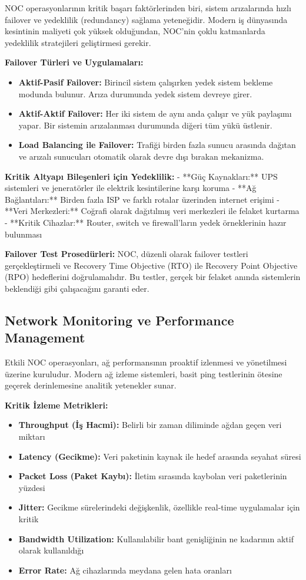 NOC operasyonlarının kritik başarı faktörlerinden biri, sistem arızalarında hızlı failover ve yedeklilik (redundancy) sağlama yeteneğidir. Modern iş dünyasında kesintinin maliyeti çok yüksek olduğundan, NOC'nin çoklu katmanlarda yedeklilik stratejileri geliştirmesi gerekir.

\textbf{Failover Türleri ve Uygulamaları:}
\begin{itemize}
    \item \textbf{Aktif-Pasif Failover:} Birincil sistem çalışırken yedek sistem bekleme modunda bulunur. Arıza durumunda yedek sistem devreye girer.
    \item \textbf{Aktif-Aktif Failover:} Her iki sistem de aynı anda çalışır ve yük paylaşımı yapar. Bir sistemin arızalanması durumunda diğeri tüm yükü üstlenir.
    \item \textbf{Load Balancing ile Failover:} Trafiği birden fazla sunucu arasında dağıtan ve arızalı sunucuları otomatik olarak devre dışı bırakan mekanizma.
\end{itemize}

\textbf{Kritik Altyapı Bileşenleri için Yedeklilik:}
- **Güç Kaynakları:** UPS sistemleri ve jeneratörler ile elektrik kesintilerine karşı koruma
- **Ağ Bağlantıları:** Birden fazla ISP ve farklı rotalar üzerinden internet erişimi
- **Veri Merkezleri:** Coğrafi olarak dağıtılmış veri merkezleri ile felaket kurtarma
- **Kritik Cihazlar:** Router, switch ve firewall'ların yedek örneklerinin hazır bulunması

\textbf{Failover Test Prosedürleri:}
NOC, düzenli olarak failover testleri gerçekleştirmeli ve Recovery Time Objective (RTO) ile Recovery Point Objective (RPO) hedeflerini doğrulamalıdır. Bu testler, gerçek bir felaket anında sistemlerin beklendiği gibi çalışacağını garanti eder.

\subsection{Network Monitoring ve Performance Management}

Etkili NOC operasyonları, ağ performansının proaktif izlenmesi ve yönetilmesi üzerine kuruludur. Modern ağ izleme sistemleri, basit ping testlerinin ötesine geçerek derinlemesine analitik yetenekler sunar.

\textbf{Kritik İzleme Metrikleri:}
\begin{itemize}
    \item \textbf{Throughput (İş Hacmi):} Belirli bir zaman diliminde ağdan geçen veri miktarı
    \item \textbf{Latency (Gecikme):} Veri paketinin kaynak ile hedef arasında seyahat süresi  
    \item \textbf{Packet Loss (Paket Kaybı):} İletim sırasında kaybolan veri paketlerinin yüzdesi
    \item \textbf{Jitter:} Gecikme sürelerindeki değişkenlik, özellikle real-time uygulamalar için kritik
    \item \textbf{Bandwidth Utilization:} Kullanılabilir bant genişliğinin ne kadarının aktif olarak kullanıldığı
    \item \textbf{Error Rate:} Ağ cihazlarında meydana gelen hata oranları
\end{itemize}

